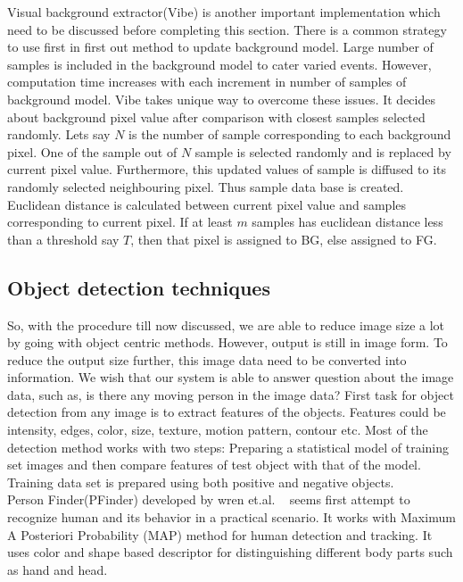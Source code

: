 \indent Visual background extractor(Vibe) \cite{9} is another important
implementation which need to be discussed before completing this
section. There is a common strategy to use first in first out method to
update background model. Large number of samples is included in the
background model to cater varied events. However, computation time
increases with each increment in number of samples of background model.
Vibe takes unique way to overcome these issues. It decides about
background pixel value after comparison with closest samples selected
randomly. Lets say $N$ is the number of sample corresponding to each
background pixel. One of the sample out of $N$ sample is selected
randomly and is replaced by current pixel value. Furthermore, this
updated values of sample is diffused to its randomly selected
neighbouring pixel. Thus sample data base is created. Euclidean distance
is calculated between current pixel value and samples corresponding to
current pixel. If at least $m$ samples has euclidean distance less than
a threshold say $T$, then that pixel is assigned to BG, else assigned to
FG.\\
\subsection{Object detection techniques}
\indent So, with the procedure till now discussed, we are able to reduce
image size a lot by going with object centric methods. However, output
is still in image form. To reduce the output size further, this image
data need to be converted into information. We wish that our system is
able to answer question about the image data, such as, is there any
moving person in the image data? First task for object detection from
any image is to extract features of the objects. Features could be
intensity, edges, color, size, texture, motion pattern, contour etc.
Most of the detection method works with two steps: Preparing a
statistical model of training set images and then compare features of
test object with that of the model.  Training data set is prepared using
both positive and negative objects.\\

\indent Person Finder(PFinder) developed by wren et.al. ~\cite{12} seems
first attempt to recognize human and its behavior in a practical
scenario. It works with Maximum A Posteriori Probability (MAP) method
for human detection and tracking. It uses color and shape based
descriptor for distinguishing different body parts such as hand and
head.\\

